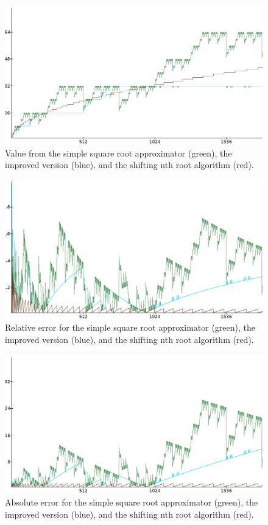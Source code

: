 		\begin{figure}[H] \centering
		\includegraphics[width=0.75\linewidth]{figure/value12x.png}
		\caption{Value from the simple square root approximator (green), the
		improved version (blue), and the shifting nth root algorithm (red).}
		\label{sres1} \end{figure}

		\begin{figure}[H] \centering
		\includegraphics[width=0.75\linewidth]{figure/rel_error_480x.png}
		\caption{Relative error for the simple square root approximator
		(green), the improved version (blue), and the shifting nth root
		algorithm (red).} \label{sres2} \end{figure}

		\begin{figure}[H] \centering
		\includegraphics[width=0.75\linewidth]{figure/abs_error_24x.png}
		\caption{Absolute error for the simple square root approximator
		(green), the improved version (blue), and the shifting nth root
		algorithm (red).} \label{sres3} \end{figure}

